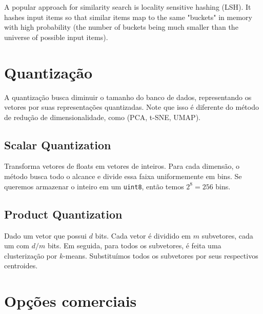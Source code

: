 A popular approach for similarity search is locality sensitive hashing (LSH). It hashes input items so that similar items map to the same "buckets" in memory with high probability (the number of buckets being much smaller than the universe of possible input items). 

\section{Quantização}

A quantização busca diminuir o tamanho do banco de dados, representando os vetores por suas representações quantizadas. Note que isso é diferente do método de redução de dimensionalidade, como (PCA, t-SNE, UMAP).

\subsection{Scalar Quantization}

Transforma vetores de floats em vetores de inteiros. Para cada dimensão, o método busca todo o alcance e divide essa faixa uniformemente em bins. Se queremos armazenar o inteiro em um \texttt{uint8}, então temos $2^8 = 256$ bins.

\subsection{Product Quantization}

Dado um vetor que possui $d$ bits. Cada vetor é dividido em $m$ subvetores, cada um com $d/m$ bits. Em seguida, para todos os subvetores, é feita uma clusterização por $k$-means. Substituímos todos os subvetores por seus respectivos centroides.


\section{Opções comerciais}





\printbibliography